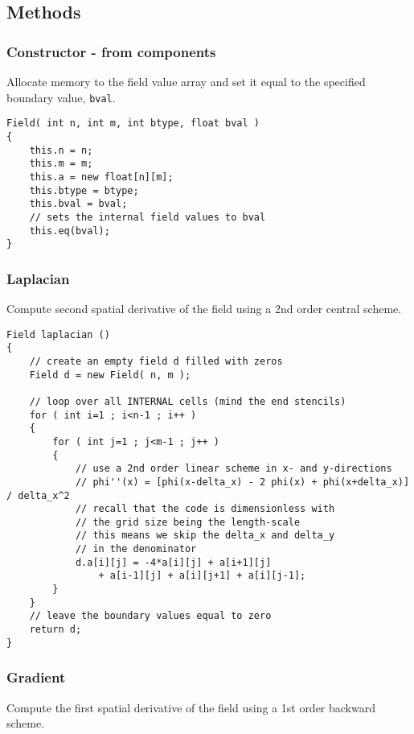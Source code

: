 \documentclass[notitlepage]{article}
\begin{document}
\subsection{Methods}

\subsubsection{Constructor - from components}

Allocate memory to the field value array and set it equal
to the specified boundary value, \texttt{bval}.

\begin{lstlisting}[style=myCpp]
Field( int n, int m, int btype, float bval )
{
	this.n = n;
	this.m = m;
	this.a = new float[n][m];
	this.btype = btype;
	this.bval = bval;
	// sets the internal field values to bval
	this.eq(bval);
}
\end{lstlisting}

\subsubsection{Laplacian}

Compute second spatial derivative of the field using a 2nd order central scheme.

\begin{lstlisting}[style=myCpp]
Field laplacian ()
{
	// create an empty field d filled with zeros
	Field d = new Field( n, m );
	
	// loop over all INTERNAL cells (mind the end stencils)
	for ( int i=1 ; i<n-1 ; i++ )
	{
		for ( int j=1 ; j<m-1 ; j++ )
		{
			// use a 2nd order linear scheme in x- and y-directions
			// phi''(x) = [phi(x-delta_x) - 2 phi(x) + phi(x+delta_x)] / delta_x^2
			// recall that the code is dimensionless with
			// the grid size being the length-scale
			// this means we skip the delta_x and delta_y
			// in the denominator
			d.a[i][j] = -4*a[i][j] + a[i+1][j]
				+ a[i-1][j] + a[i][j+1] + a[i][j-1];
		}
	}
	// leave the boundary values equal to zero
	return d;
}
\end{lstlisting}

\subsubsection{Gradient}

Compute the first spatial derivative of the field using a 1st order backward
scheme.
\end{document}
